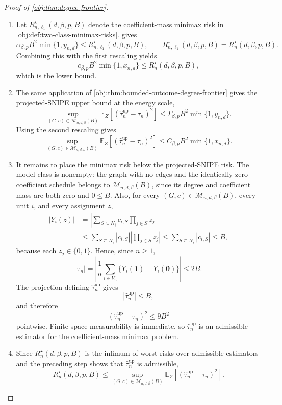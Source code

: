 \documentclass[11pt]{article}
\begin{document}
\begin{proof}[Proof of \cref{obj:thm:degree-frontier}]
\begin{enumerate}
\item
Let \(R_{n,\ell_1}^{\star}(d,\beta,p,B)\) denote the coefficient-mass minimax risk in \cref{obj:def:two-class-minimax-risks}.   gives
\[
\alpha_{\beta,p}B^2\min\{1,y_{n,d}\}
\le
R_{n,\ell_1}^{\star}(d,\beta,p,B),
\qquad
R_{n,\ell_1}^{\star}(d,\beta,p,B)=R_n^\star(d,\beta,p,B).
\]
Combining this with the first rescaling yields
\[
c_{\beta,p}B^2\min\{1,x_{n,d}\}
\le
R_n^\star(d,\beta,p,B),
\]
which is the lower bound. %

\item
The same application of \cref{obj:thm:bounded-outcome-degree-frontier} gives the projected-SNIPE upper bound at the energy scale,
\[
\sup_{(G,c)\in\mathcal M_{n,d,\beta}(B)}
\mathbb E_Z\!\left[
\left(\widehat\tau_n^{\mathrm{up}}-\tau_n\right)^2
\right]
\le
\Gamma_{\beta,p}B^2\min\{1,y_{n,d}\}.
\]
Using the second rescaling gives
\[
\sup_{(G,c)\in\mathcal M_{n,d,\beta}(B)}
\mathbb E_Z\!\left[
\left(\widehat\tau_n^{\mathrm{up}}-\tau_n\right)^2
\right]
\le
C_{\beta,p}B^2\min\{1,x_{n,d}\}.
\] %

\item
It remains to place the minimax risk below the projected-SNIPE risk.  The model class is nonempty: the graph with no edges and the identically zero coefficient schedule belongs to \(\mathcal M_{n,d,\beta}(B)\), since its degree and coefficient mass are both zero and \(0\le B\).  Also, for every \((G,c)\in\mathcal M_{n,d,\beta}(B)\), every unit \(i\), and every assignment \(z\),
\[
\begin{aligned}
|Y_i(z)|
&=
\left|
\sum_{S\subseteq N_i}
c_{i,S}\prod_{j\in S}z_j
\right|  \\
&\le
\sum_{S\subseteq N_i}
|c_{i,S}|
\left|\prod_{j\in S}z_j\right|
\le
\sum_{S\subseteq N_i}|c_{i,S}|
\le B,
\end{aligned}
\]
because each \(z_j\in\{0,1\}\).  Hence, since \(n\ge1\),
\[
|\tau_n|
=
\left|
\frac1n\sum_{i\in V_n}
\{Y_i(\mathbf 1)-Y_i(\mathbf 0)\}
\right|
\le 2B.
\]
The projection defining \(\widehat\tau_n^{\mathrm{up}}\) gives
\[
|\widehat\tau_n^{\mathrm{up}}|\le B,
\]
and therefore
\[
\left(\widehat\tau_n^{\mathrm{up}}-\tau_n\right)^2
\le 9B^2
\]
pointwise.  Finite-space measurability is immediate, so \(\widehat\tau_n^{\mathrm{up}}\) is an admissible estimator for the coefficient-mass minimax problem. %

\item
Since \(R_n^\star(d,\beta,p,B)\) is the infimum of worst risks over admissible estimators and the preceding step shows that \(\widehat\tau_n^{\mathrm{up}}\) is admissible,
\[
R_n^\star(d,\beta,p,B)
\le
\sup_{(G,c)\in\mathcal M_{n,d,\beta}(B)}
\mathbb E_Z\!\left[
\left(\widehat\tau_n^{\mathrm{up}}-\tau_n\right)^2
\right].
\] %


\end{enumerate}
\end{proof}
\end{document}
